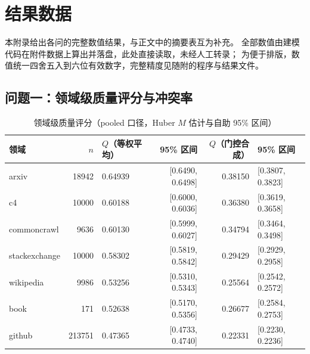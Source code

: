 \clearpage
\section{结果数据}
\label{app:data}

本附录给出各问的完整数值结果，与正文中的摘要表互为补充。
全部数值由建模代码在附件数据上算出并落盘，此处直接读取，未经人工转录；
为便于排版，数值统一四舍五入到六位有效数字，完整精度见随附的程序与结果文件。

\subsection{问题一：领域级质量评分与冲突率}

\begin{table}[htbp]
  \centering
  \caption{领域级质量评分（pooled 口径，Huber $M$ 估计与自助 95\% 区间）}
  \label{tab:app-q1-domain}
  \small
  \begin{tabular}{@{}lrlrrl@{}}
    \toprule
    领域 & $n$ & $Q$（等权平均） & 95\% 区间 & $Q$（门控合成） & 95\% 区间 \\
    \midrule
    arxiv & 18942 & 0.64939 & [0.6490, 0.6498] & 0.38150 & [0.3807, 0.3823] \\
    c4 & 10000 & 0.60188 & [0.6000, 0.6036] & 0.36380 & [0.3619, 0.3658] \\
    commoncrawl & 9636 & 0.60130 & [0.5999, 0.6027] & 0.34794 & [0.3464, 0.3498] \\
    stackexchange & 10000 & 0.58302 & [0.5819, 0.5842] & 0.29429 & [0.2929, 0.2958] \\
    wikipedia & 9986 & 0.53256 & [0.5310, 0.5343] & 0.25564 & [0.2542, 0.2572] \\
    book & 171 & 0.52638 & [0.5170, 0.5356] & 0.26677 & [0.2584, 0.2753] \\
    github & 213751 & 0.47365 & [0.4733, 0.4740] & 0.22331 & [0.2230, 0.2236] \\
    \bottomrule
  \end{tabular}
\end{table}

